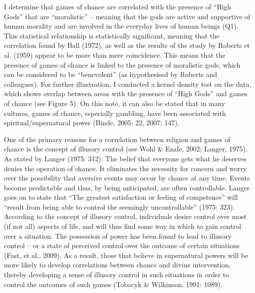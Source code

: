 \documentclass[%
	]{ijsra}
\begin{document}
I determine that games of chance are correlated with the presence of “High Gods” that are “moralistic” – meaning that the gods are active and supportive of human morality and are involved in the everyday lives of human beings (Q1). This statistical relationship is statistically significant, meaning that the correlation found by Ball (1972), as well as the results of the study by Roberts et al. (1959)%
  appear to be more than mere coincidence. This means that the presence of games of chance is linked to the presence of moralistic gods, which can be considered to be “benevolent” (as hypothesised by Roberts and colleagues). For further illustration, I conducted a kernel density test on the data, which shows overlap between areas with the presence of “High Gods” and games of chance (see Figure 5). On this note, it can also be stated that in many cultures, games of chance, especially gambling, have been associated with spiritual/supernatural power (Binde, 2005: 22, 2007: 147).


One of the primary reasons for a correlation between religion and games of chance is the concept of illusory control (see Wohl & Enzle, 2002; Langer, 1975). As stated by Langer (1975: 312): 
The belief that everyone gets what he deserves denies the operation of chance. It eliminates the necessity for concern and worry over the possibility that aversive events may occur by chance at any time. Events become predictable and thus, by being anticipated, are often controllable.
Langer goes on to state that “The greatest satisfaction or feeling of competence” will “result from being able to control the seemingly uncontrollable” (1975: 323). According to the concept of illusory control, individuals desire control over most (if not all) aspects of life, and will thus find some way in which to gain control over a situation. The possession of power has been found to lead to illusory control – or a state of perceived control over the outcome of certain situations (Fast, et al., 2009). As a result, those that believe in supernatural powers will be more likely to develop correlations between chance and divine intervention, thereby developing a sense of illusory control in such situations in order to control the outcomes of such games (Tobacyk & Wilkinson, 1991: 1089).
\end{document}
